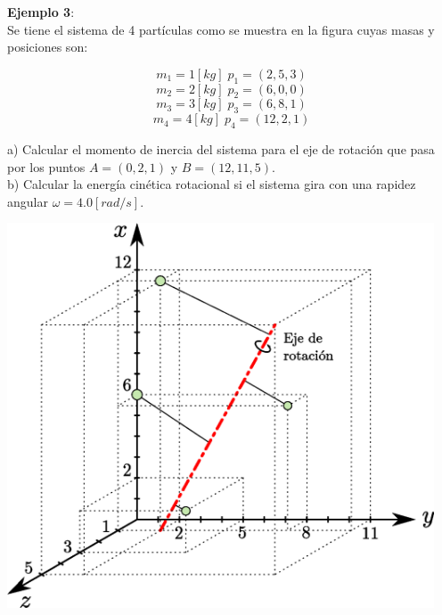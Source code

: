 \documentclass[letter,oneside,11pt]{article}
\begin{document}
\begin{minipage}[c]{.4\linewidth}
\textbf{Ejemplo 3}:\\
Se tiene el sistema de 4 partículas como se muestra en la figura cuyas masas y
posiciones son:

\begin{equation*}
    m_1 = 1 [kg]\; p_1 = (2,5,3)
\end{equation*}
\begin{equation*}
    m_2 = 2 [kg]\; p_2 = (6,0,0)
\end{equation*}
\begin{equation*}
    m_3 = 3 [kg]\; p_3 = (6,8,1)
\end{equation*}
\begin{equation*}
    m_4 = 4 [kg]\; p_4 = (12,2,1)
\end{equation*}

a) Calcular el momento de inercia del sistema para el eje de rotación que pasa
por los puntos $A = (0,2,1)$ y $B = (12,11,5)$. \\
b) Calcular la energía cinética rotacional si el sistema gira con una rapidez
angular $\omega = 4.0 [rad/s]$.
\end{minipage}\hfill
\begin{minipage}{.5\linewidth}
\includegraphics[width=0.95\textwidth]{resources/f4.eps}
\end{minipage}
\\
\\
\end{document}
